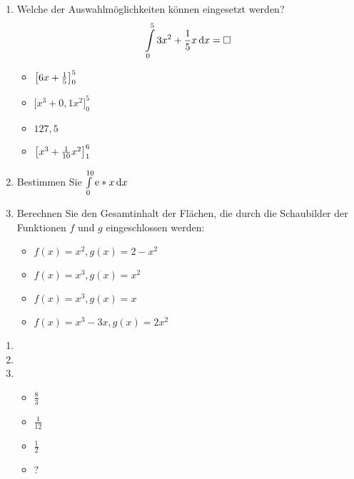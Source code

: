 \begin{enumerate}
	\item Welche der Auswahlmöglichkeiten können eingesetzt werden?
	\begin{equation*}
		\int\limits_0^5 3x^2+ \frac 1 5 x  \,\mathrm{d} x = \Box
	\end{equation*}
  \begin{multicols}{4}
    \begin{itemize}
      \item $\left[ 6x + \frac{1}{5} \right]_0^5$
      \item $\bigg[x^3 + 0,1 x^2\bigg]_0^5$
  		\item $127,5$
      \item $\left[ x^3 + \frac{1}{10} x^2 \right]_1^6$
  	\end{itemize}
  \end{multicols}


	\item Bestimmen Sie $\int\limits_0^{10} \mathrm{e}*x \,\mathrm{d} x$
  \item Berechnen Sie den Gesamtinhalt der Flächen, die durch die Schaubilder der Funktionen $f$ und $g$ eingeschlossen werden:
  \begin{itemize}
    \item $f(x)=x^2, g(x)=2-x^2$
    \item $f(x)=x^3, g(x)=x^2$
    \item $f(x)=x^3, g(x)=x$
    \item $f(x)=x^3-3x, g(x)=2x^2$
  \end{itemize}
\end{enumerate}
\begin{lsg}{}
  \begin{enumerate}
    \item
    \item
    \item
    \begin{itemize}
      \item $\frac 8 3$
      \item $\frac 1 {12}$
      \item $\frac 1 2$
      \item ?
    \end{itemize}
  \end{enumerate}
\end{lsg}


